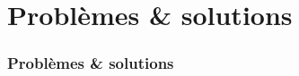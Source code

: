 \section{Problèmes \& solutions}

    \begin{frame}
        \frametitle{Problèmes \& solutions}


    \end{frame}
